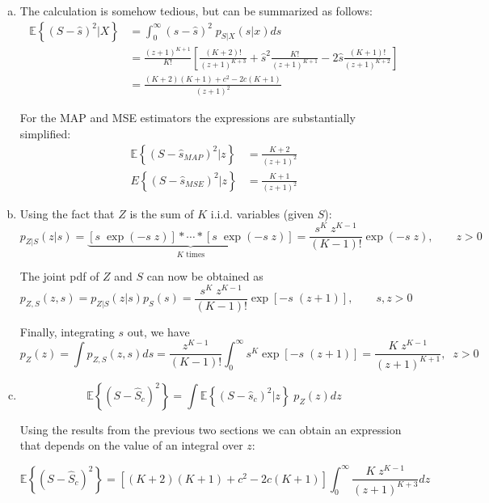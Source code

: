 \begin{solution}
\begin{enumerate}[a)]
    \item The calculation is somehow tedious, but can be summarized as follows:
    \begin{align}
        \mathbb{E}\left\{ (S-\hat{s})^2|X\right\} & = \int_0^\infty (s-\hat{s})^2 \; p_{S|X}(s|x) ds \nonumber \\
        & = \frac{(z+1)^{K+1}}{K!}\left[ \frac{(K+2) !}{(z+1)^{K+3}} + \hat{s}^2 \frac{K!}{(z+1)^{K+1}} - 2\hat{s} \frac{(K+1) !}{(z+1)^{K+2}}\right] \nonumber \\
        & = \frac{(K+2)(K+1) + c^2 - 2 c(K+1)}{(z+1)^2} \nonumber
    \end{align}
    
    For the MAP and MSE estimators the expressions are substantially simplified:
    \begin{align}
        \mathbb{E}\left\{ (S-\hat{s}_{MAP})^2|z\right\} & = \displaystyle\frac{K+2}{(z+1)^2} \nonumber \\
        {E}\left\{(S-\hat{s}_{MSE})^2|z\right\} & = \displaystyle\frac{K+1}{(z+1)^2} \nonumber 
    \end{align}
    
    \item Using the fact that $Z$ is the sum of $K$ i.i.d. variables (given $S$):
    $$p_{Z|S}(z|s) = \underbrace{[s\; \exp(-s\;z)]\ast \cdots \ast[s\; \exp(-s\;z)]}_\text{$K$ times} = \frac{s^{K}\;z^{K-1}}{(K-1)!} \exp(-s \; z), \qquad z>0$$
    
    The joint pdf of $Z$ and $S$ can now be obtained as
    $$p_{Z,S}(z,s) = p_{Z|S}(z|s)p_S(s) = \frac{s^{K}\;z^{K-1}}{(K-1) !} \exp[-s \; (z+1)], \qquad s,z>0$$
    
    Finally, integrating $s$ out, we have
    $$p_Z(z) = \int p_{Z,S}(z,s) ds = \frac{z^{K-1}}{(K-1) !}\int_0^\infty s^K \exp[-s \; (z+1)] = \frac{K\;z^{K-1}}{(z+1)^{K+1}},\;\; z>0$$
    
    \item
    $$\mathbb{E}\left\{ (S-\hat{S}_c)^2\right\} = \int \mathbb{E}\left\{ (S-\hat{s}_c)^2|z\right\} \; p_Z(z) dz$$
    
    Using the results from the previous two sections we can obtain an expression that depends on the value of an integral over $z$:
    
    $$\mathbb{E}\left\{ (S-\hat{S}_c)^2\right\} = \left[(K+2)(K+1) + c^2 - 2 c(K+1)\right] \int_0^\infty \frac{K\;z^{K-1}}{(z+1)^{K+3}} dz$$
    
    

\end{enumerate}
\end{solution}
